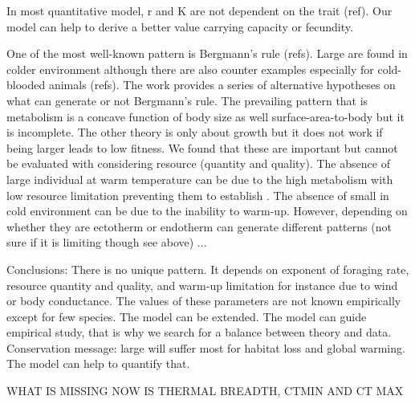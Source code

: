  In most quantitative model, r and K are not dependent on the trait (ref).
 Our model can help to derive a better value carrying capacity or fecundity.
 

One of the most well-known pattern is Bergmann's rule (refs).
Large are found in colder environment although there are also counter examples especially for cold-blooded animals (refs).
The work provides a series of alternative hypotheses on what can generate or not Bergmann's rule.
The prevailing pattern that is metabolism is a concave function of body size as well surface-area-to-body but it is incomplete.
The other theory is only about growth but it does not work if being larger leads to low fitness.
We found that these are important but cannot be evaluated with considering resource (quantity and quality).
The absence of large individual at warm temperature can be due to the high metabolism with low resource limitation preventing them to establish \citep{Angert2005}. 
The absence of small in cold environment can be due to the inability to warm-up.
However, depending on whether they are ectotherm or endotherm can generate different patterns (not sure if it is limiting though see above)
...

Conclusions:
There is no unique pattern.
It depends on exponent of foraging rate, resource quantity and quality, and warm-up limitation for instance due to wind or body conductance.
The values of these parameters  are not known empirically except for few species.
The model can be extended.
The model can guide empirical study, that is why we search for a balance between theory and data.
Conservation message: large will suffer most for habitat loss and global warming.
The model can help to quantify that. 

WHAT IS MISSING NOW IS THERMAL BREADTH, CTMIN AND CT MAX
 